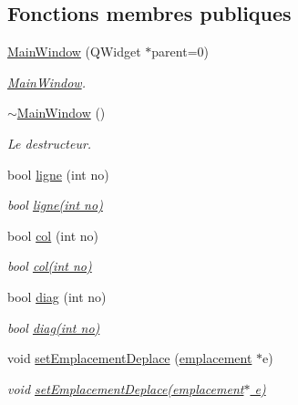 \subsection*{Fonctions membres publiques}
\begin{DoxyCompactItemize}
\item 
\hyperlink{class_main_window_a8b244be8b7b7db1b08de2a2acb9409db}{Main\-Window} (Q\-Widget $\ast$parent=0)
\begin{DoxyCompactList}\small\item\em \hyperlink{class_main_window}{Main\-Window}. \end{DoxyCompactList}\item 
\hyperlink{class_main_window_ae98d00a93bc118200eeef9f9bba1dba7}{$\sim$\-Main\-Window} ()
\begin{DoxyCompactList}\small\item\em Le destructeur. \end{DoxyCompactList}\item 
bool \hyperlink{class_main_window_a6dc1f84d9bc6e8ab7f1bb6bc04e2db49}{ligne} (int no)
\begin{DoxyCompactList}\small\item\em bool \hyperlink{class_main_window_a6dc1f84d9bc6e8ab7f1bb6bc04e2db49}{ligne(int no)} \end{DoxyCompactList}\item 
bool \hyperlink{class_main_window_a85653198b42750c0f09876f0af3715d7}{col} (int no)
\begin{DoxyCompactList}\small\item\em bool \hyperlink{class_main_window_a85653198b42750c0f09876f0af3715d7}{col(int no)} \end{DoxyCompactList}\item 
bool \hyperlink{class_main_window_a7b80bba7c56fbcc016dbc004d208ec31}{diag} (int no)
\begin{DoxyCompactList}\small\item\em bool \hyperlink{class_main_window_a7b80bba7c56fbcc016dbc004d208ec31}{diag(int no)} \end{DoxyCompactList}\item 
void \hyperlink{class_main_window_a1eefa05031d74694e4249a8c68741122}{set\-Emplacement\-Deplace} (\hyperlink{classemplacement}{emplacement} $\ast$e)
\begin{DoxyCompactList}\small\item\em void \hyperlink{class_main_window_a1eefa05031d74694e4249a8c68741122}{set\-Emplacement\-Deplace(emplacement$\ast$ e)} \end{DoxyCompactList}\item 

\end{DoxyCompactItemize}
